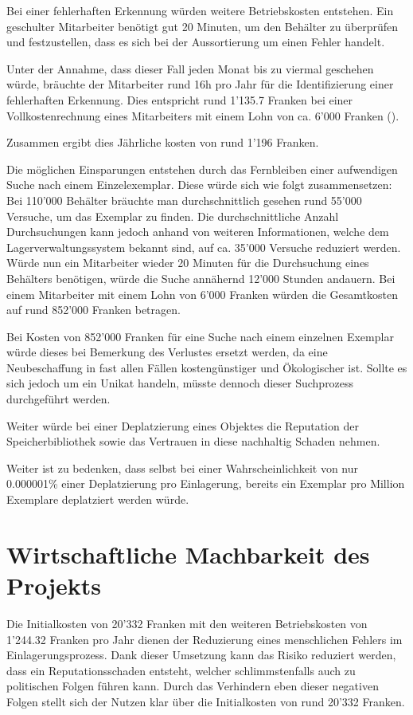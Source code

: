 Bei einer fehlerhaften Erkennung würden weitere Betriebskosten entstehen. Ein geschulter Mitarbeiter benötigt gut 20 Minuten, um den Behälter zu überprüfen und festzustellen, dass es sich bei der Aussortierung um einen Fehler handelt.

Unter der Annahme, dass dieser Fall jeden Monat bis zu viermal geschehen würde, bräuchte der Mitarbeiter rund 16h pro Jahr für die Identifizierung einer fehlerhaften Erkennung. Dies entspricht rund 1'135.7 Franken bei einer Vollkostenrechnung eines Mitarbeiters mit einem Lohn von ca. 6'000 Franken (\cite{KostenProMitarbeiter2013}).

Zusammen ergibt dies Jährliche kosten von rund 1'196 Franken.

Die möglichen Einsparungen entstehen durch das Fernbleiben einer aufwendigen Suche nach einem Einzelexemplar. Diese würde sich wie folgt zusammensetzen:
Bei 110'000 Behälter bräuchte man durchschnittlich gesehen rund 55'000 Versuche, um das Exemplar zu finden. Die durchschnittliche Anzahl Durchsuchungen kann jedoch anhand von weiteren Informationen, welche dem Lagerverwaltungssystem bekannt sind, auf ca. 35'000 Versuche reduziert werden. Würde nun ein Mitarbeiter wieder 20 Minuten für die Durchsuchung eines Behälters benötigen, würde die Suche annähernd 12'000 Stunden andauern. Bei einem Mitarbeiter mit einem Lohn von 6'000 Franken würden die Gesamtkosten auf rund 852'000 Franken betragen.

Bei Kosten von 852'000 Franken für eine Suche nach einem einzelnen Exemplar würde dieses bei Bemerkung des Verlustes ersetzt werden, da eine Neubeschaffung in fast allen Fällen kostengünstiger und Ökologischer ist. Sollte es sich jedoch um ein Unikat handeln, müsste dennoch dieser Suchprozess durchgeführt werden.

Weiter würde bei einer Deplatzierung eines Objektes die Reputation der Speicherbibliothek sowie das Vertrauen in diese nachhaltig Schaden nehmen.

Weiter ist zu bedenken, dass selbst bei einer Wahrscheinlichkeit von nur 0.000001\% einer Deplatzierung pro Einlagerung, bereits ein Exemplar pro Million Exemplare deplatziert werden würde.

\chapter{Wirtschaftliche Machbarkeit des Projekts}
Die Initialkosten von 20'332 Franken mit den weiteren Betriebskosten von 1'244.32 Franken pro Jahr dienen der Reduzierung eines menschlichen Fehlers im Einlagerungsprozess. Dank dieser Umsetzung kann das Risiko reduziert werden, dass ein Reputationsschaden entsteht, welcher schlimmstenfalls auch zu politischen Folgen führen kann.
Durch das Verhindern eben dieser negativen Folgen stellt sich der Nutzen klar über die Initialkosten von rund 20'332 Franken.

